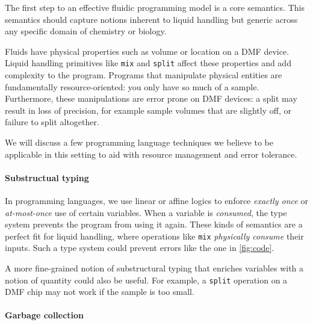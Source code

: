 \documentclass[
  10pt,
  a4paper,
  twocolumn,
]{article}
\begin{document}
The first step to an effective fluidic programming model is a core semantics.
This semantics should capture notions inherent to liquid handling but generic across any specific domain of
chemistry or biology.

Fluids have physical properties such as volume or location on a DMF device.
Liquid handling primitives like {\tt mix} and {\tt split} affect these properties and add complexity to the program.
Programs that manipulate physical entities are fundamentally resource-oriented: you only have so much of a sample.
Furthermore, these manipulations are error prone on DMF devices: a split may result in loss of precision, for example sample volumes that are slightly off, or failure to split altogether.

We will discuss a few programming language techniques we believe to be applicable in this setting to aid with
resource management and error tolerance.


\paragraph{Substructual typing}

In programming languages, we use linear or affine logics to enforce \emph{exactly once} or \emph{at-most-once} use of certain variables. When a variable is \emph{consumed}, the type system prevents the program from using it again.
These kinds of semantics are a perfect fit for liquid handling, where
operations like {\tt mix} \emph{physically consume} their inputs.
Such a type system could prevent errors like the one in \autoref{fig:code}.

A more fine-grained notion of substructural typing that enriches variables with a notion of quantity could also be useful.
For example, a {\tt split} operation on a DMF chip may not work if the sample is too small.

\paragraph{Garbage collection}
\end{document}
